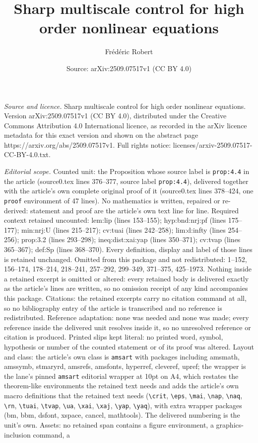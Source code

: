 \documentclass[10pt,a4paper]{amsart}
\title[Sharp multiscale control for high order nonlinear equations]{Sharp multiscale control for high order nonlinear equations}
\author{Fr\'ed\'eric Robert}
\date{Source: arXiv:2509.07517v1 (CC BY 4.0)}
\begin{document}
\maketitle

\noindent\emph{Source and licence.} Sharp multiscale control for high order nonlinear equations. Version arXiv:2509.07517v1 (CC BY 4.0), distributed under the Creative Commons Attribution 4.0 International licence, as recorded in the arXiv licence metadata for this exact version and shown on the abstract page https://arxiv.org/abs/2509.07517v1. Full rights notice: licenses/arxiv-2509.07517-CC-BY-4.0.txt.\par\smallskip

\noindent\textit{Editorial scope.} Counted unit: the Proposition whose source label is \texttt{prop:4.4} in the article (source0.tex lines 376--377, source label \texttt{prop:4.4}), delivered together with the article's own complete original proof of it (source0.tex lines 378--424, one \texttt{proof} environment of 47 lines). No mathematics is written, repaired or re-derived: statement and proof are the article's own text line for line. Required context retained uncounted: lem:lip (lines 153--155); hyp:bnd:nrj:pf (lines 175--177); min:nrj:U (lines 215--217); cv:tuai (lines 242--258); lim:d:infty (lines 254--256); prop:3.2 (lines 293--298); ineq:dist:xai:yap (lines 350--371); cv:tvap (lines 365--367); def:Sp (lines 368--370). Every definition, display and label of those lines is retained unchanged. Omitted from this package and not redistributed: 1--152, 156--174, 178--214, 218--241, 257--292, 299--349, 371--375, 425--1973. Nothing inside a retained excerpt is omitted or altered: every retained body is delivered exactly as the article's lines are written, so no omission receipt of any kind accompanies this package. Citations: the retained excerpts carry no citation command at all, so no bibliography entry of the article is transcribed and no reference is redistributed. Reference adaptation: none was needed and none was made; every reference inside the delivered unit resolves inside it, so no unresolved reference or citation is produced. Printed slips kept literal: no printed word, symbol, hypothesis or number of the counted statement or of its proof was altered. Layout and class: the article's own class is \texttt{amsart} with packages including amsmath, amssymb, stmaryrd, amsrefs, amsfonts, hyperref, cleveref, upref; the wrapper is the lane's pinned \texttt{amsart} editorial wrapper at 10pt on A4, which restates the theorem-like environments the retained text needs and adds the article's own macro definitions that the retained text needs (\texttt{\textbackslash crit}, \texttt{\textbackslash eps}, \texttt{\textbackslash mai}, \texttt{\textbackslash nap}, \texttt{\textbackslash naq}, \texttt{\textbackslash rn}, \texttt{\textbackslash tuai}, \texttt{\textbackslash tvap}, \texttt{\textbackslash ua}, \texttt{\textbackslash xai}, \texttt{\textbackslash xaj}, \texttt{\textbackslash yap}, \texttt{\textbackslash yaq}), with extra wrapper packages (bm, bbm, dsfont, xspace, cancel, mathtools). The delivered numbering is the unit's own. Assets: no retained span contains a figure environment, a graphics-inclusion command, a 
\end{document}
